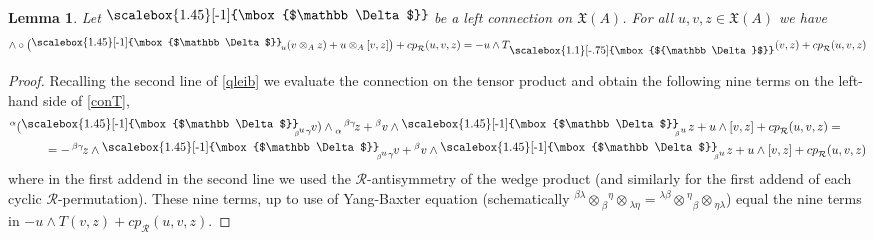 \documentclass[12pt]{article}
\numberwithin{equation}{section}
\theoremstyle{plain}
\newtheorem{lemma}[proposition]{Lemma}
\theoremstyle{definition}
\theoremstyle{remark}
\def\Vect{\mathfrak{X}}
\def\oA{\otimes_A}
\def\dd{\mathrm{d}}
\def\dd{{\nabla}}
\def\al{\alpha}
\def\be{\beta}
\def\dd{\mathrm{d}}
\def\std{{\raisebox{\depth}{\scalebox{1.45}[-1]{\mbox{$\mathbb \Delta$}}}}_{\!}}
\def\pstd{{}^{\phantom{J}}_{\raisebox{\depth}{\scalebox{1.1}[-.75]{\mbox{${\mathbb
            \Delta}$}}}}}
\def\stdd{\phantom{\!\!\!\dd}\pstd}
\begin{document}
\begin{lemma}\label{contor}
Let  $\std$ be a left connection on $\Vect(A)$.  For all $u,v,z\in \Vect(A)$ we have
\begin{equation}\label{conT}\wedge\circ\big( \std{}_u(v\otimes_A z)+u\oA [v,z]\big) + cp^{}_{\mathcal{R}}(u,v,z)=-u\wedge T\!\!\:\stdd(v,z)+ cp^{}_{\mathcal{R}}(u,v,z)\end{equation}
\end{lemma}
\begin{proof}
Recalling the second line of \eqref{qleib} we evaluate the connection on the tensor product and obtain the following nine terms on the left-hand side of \eqref{conT},
  \begin{equation}
    \begin{split}
    {}^\al&({\std{}_{{\!\!}^{\!\!}_\be\!\!\: u}}{\!\:}^{}_\gamma{}_{\!} v)\wedge {}^{}_\al{\,}^{\be\gamma\!}z  + {}^\be v\wedge \std{}_{{}^{}_{\!\!\be} u\,}z+ u\wedge [v,z] +cp^{}_{\mathcal{R}}(u,v,z)=\\
      &~~~~~~~=  - {\,}^{\be\gamma\!}z\wedge {\std{}_{{\!}^{\!\!}_\be\!\!\: u}}{\!\:}^{}_\gamma{}_{\!} v + {}^\be v\wedge \std{}_{{\!\!\:\!}^{}_\be\!\!\; u}\!\;z+ u\wedge [v,z] +cp^{}_{\mathcal{R}}(u,v,z)
            \end{split}\end{equation}
          where in the first addend in the second line we used the  ${\mathcal{R}}$-antisymmetry of the wedge product
          (and similarly for the first addend of each  cyclic  ${\mathcal{R}}$-permutation). These nine terms, up to
          use of Yang-Baxter equation
          (schematically ${}^{\beta\lambda}\otimes {}^{}_\be{}_{}^\eta\otimes {}^{}_{\lambda\eta}=
{}^{\lambda\be}\otimes {}_{}^\eta{}^{}_\be\otimes {}^{}_{\eta\lambda}$) equal the nine terms in $-u\wedge T(v,z)+cp^{}_{\mathcal{R}}(u,v,z)$. 
\end{proof}
\end{document}
